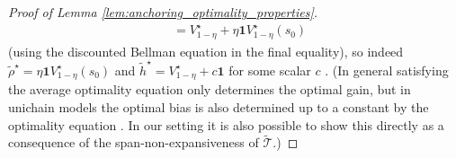 \documentclass{article}
\theoremstyle{plain}
\theoremstyle{plain}
\theoremstyle{remark}
\theoremstyle{plain}
\theoremstyle{plain}
\newcommand{\one}{\mathbf{1}}
\newcommand{\htilde}{\widetilde{h}}
\newcommand{\rhot}{\widetilde{\rho}}
\newcommand{\Topt}{\widetilde{\mathcal{T}}}
\begin{document}
\begin{proof}[Proof of Lemma \ref{lem:anchoring_optimality_properties}]
\begin{align*}
        &= V^\star_{1-\eta} + \eta \one V^\star_{1-\eta}(s_0)
    \end{align*}
    (using the discounted Bellman equation in the final equality), so indeed $\rhot^\star = \eta \one V^\star_{1-\eta}(s_0)$ and $\htilde^\star = V^\star_{1-\eta} + c \one$ for some scalar $c$ \cite[Theorem 8.4.3]{puterman_markov_1994}. (In general satisfying the average optimality equation only determines the optimal gain, but in unichain models the optimal bias is also determined up to a constant by the optimality equation \cite[Section 8.4.2]{puterman_markov_1994} \cite{schweitzer_functional_1978}. In our setting it is also possible to show this directly as a consequence of the span-non-expansiveness of $\Topt$.)


\end{proof}
\end{document}
